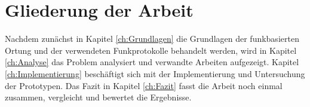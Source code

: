 \section{Gliederung der Arbeit}
\label{ch:Einleitung:sec:Gliederung}
Nachdem zunächst in Kapitel \ref{ch:Grundlagen} die Grundlagen der funkbasierten Ortung und der verwendeten Funkprotokolle behandelt werden, wird in Kapitel \ref{ch:Analyse} das Problem analysiert und verwandte Arbeiten aufgezeigt.
Kapitel \ref{ch:Implementierung} beschäftigt sich mit der Implementierung und Untersuchung der Prototypen. 
Das Fazit in Kapitel \ref{ch:Fazit} fasst die Arbeit noch einmal zusammen, vergleicht und bewertet die Ergebnisse.
